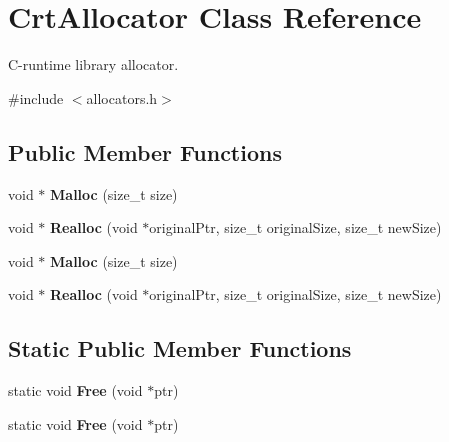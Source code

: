 \hypertarget{class_crt_allocator}{}\section{Crt\+Allocator Class Reference}
\label{class_crt_allocator}


C-\/runtime library allocator.  




{\ttfamily \#include $<$allocators.\+h$>$}

\subsection*{Public Member Functions}
\begin{DoxyCompactItemize}
\item 
void $\ast$ {\bfseries Malloc} (size\+\_\+t size)\hypertarget{class_crt_allocator_acd720631f8c094041afa6c7951f0d935}{}\label{class_crt_allocator_acd720631f8c094041afa6c7951f0d935}

\item 
void $\ast$ {\bfseries Realloc} (void $\ast$original\+Ptr, size\+\_\+t original\+Size, size\+\_\+t new\+Size)\hypertarget{class_crt_allocator_a646bb6f68afe773a62a22f7f14f83e97}{}\label{class_crt_allocator_a646bb6f68afe773a62a22f7f14f83e97}

\item 
void $\ast$ {\bfseries Malloc} (size\+\_\+t size)\hypertarget{class_crt_allocator_acd720631f8c094041afa6c7951f0d935}{}\label{class_crt_allocator_acd720631f8c094041afa6c7951f0d935}

\item 
void $\ast$ {\bfseries Realloc} (void $\ast$original\+Ptr, size\+\_\+t original\+Size, size\+\_\+t new\+Size)\hypertarget{class_crt_allocator_a646bb6f68afe773a62a22f7f14f83e97}{}\label{class_crt_allocator_a646bb6f68afe773a62a22f7f14f83e97}

\end{DoxyCompactItemize}
\subsection*{Static Public Member Functions}
\begin{DoxyCompactItemize}
\item 
static void {\bfseries Free} (void $\ast$ptr)\hypertarget{class_crt_allocator_a5043907058d906dcb1291e9491560373}{}\label{class_crt_allocator_a5043907058d906dcb1291e9491560373}

\item 
static void {\bfseries Free} (void $\ast$ptr)\hypertarget{class_crt_allocator_a5043907058d906dcb1291e9491560373}{}\label{class_crt_allocator_a5043907058d906dcb1291e9491560373}

\end{DoxyCompactItemize}
